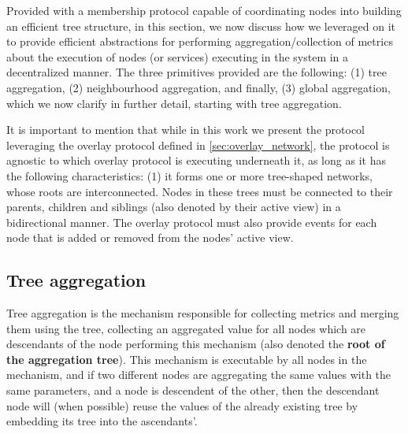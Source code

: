 
Provided with a membership protocol capable of coordinating nodes into building an efficient tree structure, in this section, we now discuss how we leveraged on it to provide efficient abstractions for performing aggregation/collection of metrics about the execution of nodes (or services) executing in the system in a decentralized manner. The three primitives provided are the following: (1) tree aggregation, (2) neighbourhood aggregation, and finally, (3) global aggregation, which we now clarify in further detail, starting with tree aggregation.

It is important to mention that while in this work we present the protocol leveraging the overlay protocol defined in \ref{sec:overlay_network}, the protocol is agnostic to which overlay protocol is executing underneath it, as long as it has the following characteristics: (1) it forms one or more tree-shaped networks, whose roots are interconnected. Nodes in these trees must be connected to their parents, children and siblings (also denoted by their active view) in a bidirectional manner. The overlay protocol must also provide events for each node that is added or removed from the nodes' active view.

\subsection{Tree aggregation} \label{sec:mon_protocol:tree_agg}

Tree aggregation is the mechanism responsible for collecting metrics and merging them using the tree, collecting an aggregated value for all nodes which are descendants of the node performing this mechanism (also denoted the \textbf{root of the aggregation tree}). This mechanism is executable by all nodes in the mechanism, and if two different nodes are aggregating the same values with the same parameters, and a node is descendent of the other, then the descendant node will (when possible) reuse the values of the already existing tree by embedding its tree into the ascendants'.

